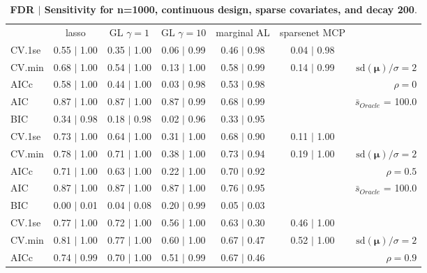 \clearpage
\begin{table}\vspace{-.5cm}
\caption[l]{ {\it }
{ \bf FDR $\boldsymbol{\mid}$ Sensitivity for n=1000, continuous design, sparse covariates, and  decay  200}.}
\vspace{-.5cm}
\footnotesize{}
\begin{center}
\begin{tabular}{l*{5}{c}|r}
 & lasso & GL $\gamma=1$ & GL $\gamma=10$ & marginal AL & sparsenet MCP  & \\
 \cline{1-7}
CV.1se & 0.55 $\mid$ 1.00 & 0.35 $\mid$ 1.00 & 0.06 $\mid$ 0.99 & 0.46 $\mid$ 0.98 & 0.04 $\mid$ 0.98 & \\
CV.min & 0.68 $\mid$ 1.00 & 0.54 $\mid$ 1.00 & 0.13 $\mid$ 1.00 & 0.58 $\mid$ 0.99 & 0.14 $\mid$ 0.99 &  $\mathrm{sd}(\mathbf{\mu})/\sigma=2$ \\
AICc & 0.58 $\mid$ 1.00 & 0.44 $\mid$ 1.00 & 0.03 $\mid$ 0.98 & 0.53 $\mid$ 0.98 & & $\rho=0$ \\
AIC & 0.87 $\mid$ 1.00 & 0.87 $\mid$ 1.00 & 0.87 $\mid$ 0.99 & 0.68 $\mid$ 0.99 & &  \multirow{2}{*}{$\bar{s}_{Oracle}$ = 100.0} \\
BIC & 0.34 $\mid$ 0.98 & 0.18 $\mid$ 0.98 & 0.02 $\mid$ 0.96 & 0.33 $\mid$ 0.95 & &  \\
 \hline 
CV.1se & 0.73 $\mid$ 1.00 & 0.64 $\mid$ 1.00 & 0.31 $\mid$ 1.00 & 0.68 $\mid$ 0.90 & 0.11 $\mid$ 1.00 & \\
CV.min & 0.78 $\mid$ 1.00 & 0.71 $\mid$ 1.00 & 0.38 $\mid$ 1.00 & 0.73 $\mid$ 0.94 & 0.19 $\mid$ 1.00 &  $\mathrm{sd}(\mathbf{\mu})/\sigma=2$ \\
AICc & 0.71 $\mid$ 1.00 & 0.63 $\mid$ 1.00 & 0.22 $\mid$ 1.00 & 0.70 $\mid$ 0.92 & & $\rho=0.5$ \\
AIC & 0.87 $\mid$ 1.00 & 0.87 $\mid$ 1.00 & 0.87 $\mid$ 1.00 & 0.76 $\mid$ 0.95 & &  \multirow{2}{*}{$\bar{s}_{Oracle}$ = 100.0} \\
BIC & 0.00 $\mid$ 0.01 & 0.04 $\mid$ 0.08 & 0.20 $\mid$ 0.99 & 0.05 $\mid$ 0.03 & &  \\
 \hline 
CV.1se & 0.77 $\mid$ 1.00 & 0.72 $\mid$ 1.00 & 0.56 $\mid$ 1.00 & 0.63 $\mid$ 0.30 & 0.46 $\mid$ 1.00 & \\
CV.min & 0.81 $\mid$ 1.00 & 0.77 $\mid$ 1.00 & 0.60 $\mid$ 1.00 & 0.67 $\mid$ 0.47 & 0.52 $\mid$ 1.00 &  $\mathrm{sd}(\mathbf{\mu})/\sigma=2$ \\
AICc & 0.74 $\mid$ 0.99 & 0.70 $\mid$ 1.00 & 0.51 $\mid$ 0.99 & 0.67 $\mid$ 0.46 & & $\rho=0.9$ \\

\end{tabular}
\end{center}
\end{table}
